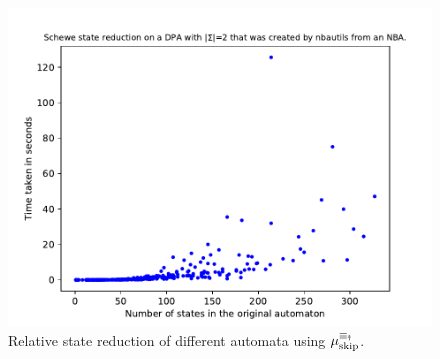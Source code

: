 \begin{figure}
\begin{minipage}{0.49\textwidth}
		\includegraphics[page=2,height=.3\textheight]{../data/analysis/schewe/detnbaut_ap1.pdf} 
		\caption{Relative state reduction of different automata using $\mu_\text{skip}^{\equiv_\text{\Ankh}}$.}
		\label{fig:schewe:empirical_reduct_rel}
	\end{minipage}
\end{figure}


